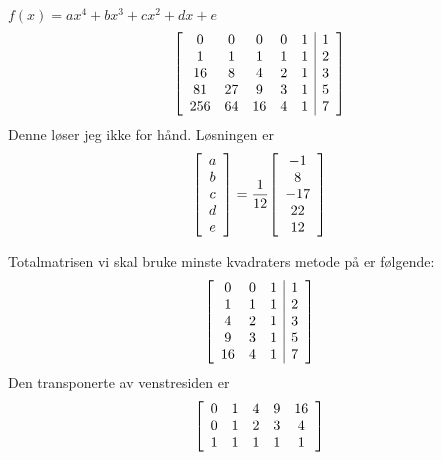 \documentclass[11pt, a4paper, norsk]{NTNUoving}
\newenvironment{pkt}{\begin{punkt}}{\end{punkt}}
\newenvironment{matrise}[1][c]
{
\left[\begin{array}{#1}
}
{    
\end{array}\right]           
}
\begin{document}
\begin{oppgave}
    \begin{pkt}
        $f(x)=ax^4+bx^3+cx^2+dx+e$
        \begin{align*}
            \begin{matrise}[ccccc|c]
                0 & 0 & 0 & 0 & 1 & 1\\
                1 & 1 & 1 & 1 & 1 & 2\\
                16 & 8 & 4 & 2 & 1 & 3\\
                81 & 27 & 9 & 3 & 1 & 5\\
                256 & 64 & 16 & 4 & 1 & 7
            \end{matrise}
        \end{align*}
        Denne løser jeg ikke for hånd. Løsningen er $$\begin{matrise}
        a\\b\\c\\d\\e
        \end{matrise}=\frac{1}{12}\begin{matrise}
        -1\\ 8 \\ -17 \\ 22 \\ 12
        \end{matrise}$$
    \end{pkt}
    \begin{pkt}
    Totalmatrisen vi skal bruke minste kvadraters metode på er følgende:
        \begin{align*}
            \begin{matrise}[ccc|c]
                 0 & 0 & 1 & 1\\
                 1 & 1 & 1 & 2\\
                 4 & 2 & 1 & 3\\
                 9 & 3 & 1 & 5\\
                 16 & 4 & 1 & 7
            \end{matrise}
        \end{align*}
        Den transponerte av venstresiden er 
        \begin{align*}
            \begin{matrise}[ccccc]
                 0 & 1 & 4 & 9 & 16\\
                 0 & 1 & 2 & 3 & 4\\
                 1 & 1 & 1 & 1 & 1

\end{matrise}
\end{align*}
\end{pkt}
\end{oppgave}
\end{document}
